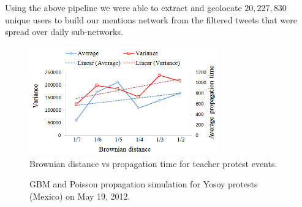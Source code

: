 Using the above pipeline we were able to extract and geolocate $20,227,830$ unique users to build our mentions network from the filtered tweets that were spread over daily sub-networks.


\begin{figure}[t]
\centering
\includegraphics[width=3.2in] {figures/infectdTime.png}
\caption{Brownian distance vs propagation time
for teacher protest events.}
\label{fig:timecurve}
\end{figure}




\begin{figure}[t]
\centering
{}
\caption{GBM and Poisson propagation simulation for Yosoy protests
(Mexico) on May 19, 2012.}
\label{fig:1Yosoy2012may}
\end{figure}


